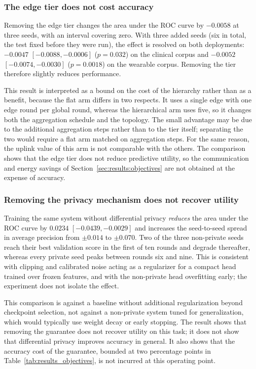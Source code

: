 \subsubsection{The edge tier does not cost accuracy}
Removing the edge tier changes the area under the ROC curve by $-0.0058$ at
three seeds, with an interval covering zero. With three added seeds (six in total, the test
fixed before they were run), the effect is resolved on both deployments: $-0.0047$
$[-0.0088, -0.0006]$ ($p = 0.032$) on the clinical corpus and $-0.0052$
$[-0.0074, -0.0030]$ ($p = 0.0018$) on the wearable corpus. Removing the tier
therefore slightly reduces performance.

This result is interpreted as a bound on the cost of the hierarchy rather than
as a benefit, because the flat arm differs in two respects. It uses a single
edge with one edge round per global round, whereas the hierarchical arm uses
five, so it changes both the aggregation schedule and the topology. The small
advantage may be due to the additional aggregation steps rather than to the
tier itself; separating the two would require a flat arm matched on
aggregation steps. For the same reason, the uplink value of this arm is not
comparable with the others. The comparison shows that the edge tier does not
reduce predictive utility, so the communication and energy savings of
Section~\ref{sec:results:objectives} are not obtained at the expense of
accuracy.

\subsubsection{Removing the privacy mechanism does not recover utility}
Training the same system without differential privacy \emph{reduces} the area
under the ROC curve by $0.0234$ $[-0.0439, -0.0029]$ and increases the
seed-to-seed spread in average precision from $\pm 0.014$ to $\pm 0.070$. Two of
the three non-private seeds reach their best validation score in the first of
ten rounds and degrade thereafter, whereas every private seed peaks between
rounds six and nine. This is consistent with clipping and calibrated noise
acting as a regularizer for a compact head trained over frozen features, and
with the non-private head overfitting early; the experiment does not isolate
the effect.

This comparison is against a baseline without additional regularization beyond
checkpoint selection, not against a non-private system tuned for
generalization, which would typically use weight decay or early stopping. The
result shows that removing the guarantee does not recover utility on this task;
it does not show that differential privacy improves accuracy in general. It
also shows that the accuracy cost of the guarantee, bounded at two percentage
points in Table~\ref{tab:results_objectives}, is not incurred at this operating
point.

